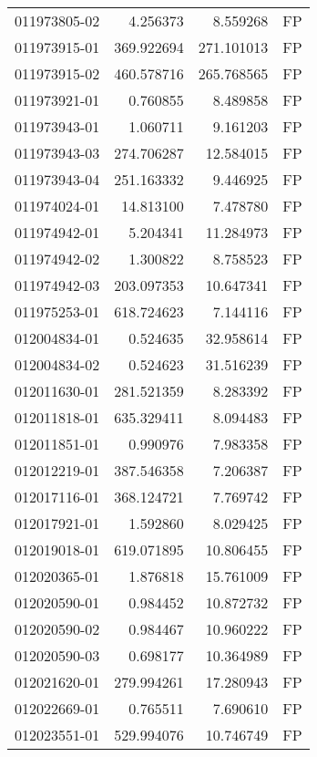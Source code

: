 \begin{tabular}{lrrl}
011973805-02 &    4.256373 &       8.559268 &   FP \\
011973915-01 &  369.922694 &     271.101013 &   FP \\
011973915-02 &  460.578716 &     265.768565 &   FP \\
011973921-01 &    0.760855 &       8.489858 &   FP \\
011973943-01 &    1.060711 &       9.161203 &   FP \\
011973943-03 &  274.706287 &      12.584015 &   FP \\
011973943-04 &  251.163332 &       9.446925 &   FP \\
011974024-01 &   14.813100 &       7.478780 &   FP \\
011974942-01 &    5.204341 &      11.284973 &   FP \\
011974942-02 &    1.300822 &       8.758523 &   FP \\
011974942-03 &  203.097353 &      10.647341 &   FP \\
011975253-01 &  618.724623 &       7.144116 &   FP \\
012004834-01 &    0.524635 &      32.958614 &   FP \\
012004834-02 &    0.524623 &      31.516239 &   FP \\
012011630-01 &  281.521359 &       8.283392 &   FP \\
012011818-01 &  635.329411 &       8.094483 &   FP \\
012011851-01 &    0.990976 &       7.983358 &   FP \\
012012219-01 &  387.546358 &       7.206387 &   FP \\
012017116-01 &  368.124721 &       7.769742 &   FP \\
012017921-01 &    1.592860 &       8.029425 &   FP \\
012019018-01 &  619.071895 &      10.806455 &   FP \\
012020365-01 &    1.876818 &      15.761009 &   FP \\
012020590-01 &    0.984452 &      10.872732 &   FP \\
012020590-02 &    0.984467 &      10.960222 &   FP \\
012020590-03 &    0.698177 &      10.364989 &   FP \\
012021620-01 &  279.994261 &      17.280943 &   FP \\
012022669-01 &    0.765511 &       7.690610 &   FP \\
012023551-01 &  529.994076 &      10.746749 &   FP \\

\end{tabular}
